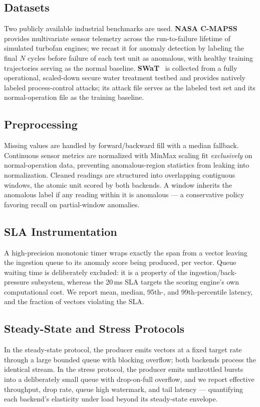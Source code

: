 \subsection{Datasets}
Two publicly available industrial benchmarks are used.
\textbf{NASA C-MAPSS}~\cite{saxena2008damage} provides multivariate sensor
telemetry across the run-to-failure lifetime of simulated turbofan
engines; we recast it for anomaly detection by labeling the final $N$
cycles before failure of each test unit as anomalous, with healthy
training trajectories serving as the normal baseline.
\textbf{SWaT}~\cite{goh2016swat} is collected from a fully operational,
scaled-down secure water treatment testbed and provides natively labeled
process-control attacks; its attack file serves as the labeled test set
and its normal-operation file as the training baseline.

\subsection{Preprocessing}
Missing values are handled by forward/backward fill with a median
fallback. Continuous sensor metrics are normalized with MinMax scaling fit
\emph{exclusively} on normal-operation data, preventing anomalous-region
statistics from leaking into normalization. Cleaned readings are
structured into overlapping contiguous windows, the atomic unit scored by
both backends. A window inherits the anomalous label if any reading within
it is anomalous --- a conservative policy favoring recall on
partial-window anomalies.

\subsection{SLA Instrumentation}
A high-precision monotonic timer wraps exactly the span from a vector
leaving the ingestion queue to its anomaly score being produced, per
vector. Queue waiting time is deliberately excluded: it is a property of
the ingestion/back-pressure subsystem, whereas the 20\,ms SLA targets the
scoring engine's own computational cost. We report mean, median, 95th-,
and 99th-percentile latency, and the fraction of vectors violating the
SLA.

\subsection{Steady-State and Stress Protocols}
In the steady-state protocol, the producer emits vectors at a fixed target
rate through a large bounded queue with blocking overflow; both backends
process the identical stream. In the stress protocol, the producer emits
unthrottled bursts into a deliberately small queue with drop-on-full
overflow, and we report effective throughput, drop rate, queue high
watermark, and tail latency --- quantifying each backend's elasticity
under load beyond its steady-state envelope.

